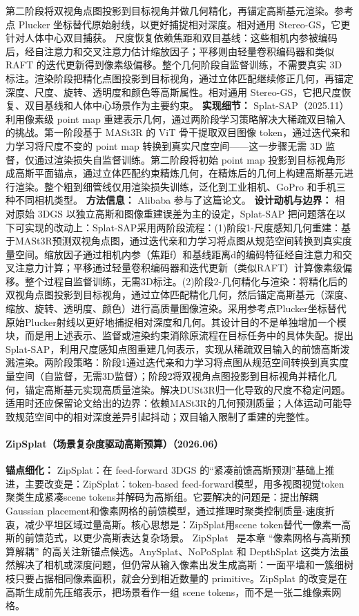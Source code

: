 第二阶段将双视角点图投影到目标视角并做几何精化，再锚定高斯基元渲染。参考点 Plucker 坐标替代原始射线，以更好捕捉相对深度。相对通用 Stereo-GS，它更针对人体中心双目捕获。
尺度恢复依赖焦距和双目基线：这些相机内参被编码后，经自注意力和交叉注意力估计缩放因子；平移则由轻量卷积编码器和类似 RAFT 的迭代更新得到像素级偏移。整个几何阶段自监督训练，不需要真实 3D 标注。渲染阶段把精化点图投影到目标视角，通过立体匹配继续修正几何，再锚定深度、尺度、旋转、透明度和颜色等高斯属性。相对通用 Stereo-GS，它把尺度恢复、双目基线和人体中心场景作为主要约束。
\textbf{实现细节：} Splat-SAP（2025.11） 利用像素级 point map 重建表示几何，通过两阶段学习策略解决大稀疏双目输入的挑战。第一阶段基于 MASt3R 的 ViT 骨干提取双目图像 token，通过迭代亲和力学习将尺度不变的 point map 转换到真实尺度空间——这一步骤无需 3D 监督，仅通过渲染损失自监督训练。第二阶段将初始 point map 投影到目标视角形成高斯平面锚点，通过立体匹配约束精炼几何，在精炼后的几何上构建高斯基元进行渲染。整个粗到细管线仅用渲染损失训练，泛化到工业相机、GoPro 和手机三种不同相机类型。
\textbf{方法信息：} Alibaba 参与了这篇论文。
\textbf{设计动机与边界：} 相对原始 3DGS 以独立高斯和图像重建误差为主的设定，Splat-SAP 把问题落在以下可实现的改动上：Splat-SAP采用两阶段流程：(1)阶段1-尺度感知几何重建：基于MASt3R预测双视角点图，通过迭代亲和力学习将点图从规范空间转换到真实度量空间。缩放因子通过相机内参（焦距f）和基线距离d的编码特征经自注意力和交叉注意力计算；平移通过轻量卷积编码器和迭代更新（类似RAFT）计算像素级偏移。整个过程自监督训练，无需3D标注。(2)阶段2-几何精化与渲染：将精化后的双视角点图投影到目标视角，通过立体匹配精化几何，然后锚定高斯基元（深度、缩放、旋转、透明度、颜色）进行高质量图像渲染。采用参考点Plucker坐标替代原始Plucker射线以更好地捕捉相对深度和几何。其设计目的不是单独增加一个模块，而是用上述表示、监督或渲染约束消除原流程在目标任务中的具体失配。提出Splat-SAP，利用尺度感知点图重建几何表示，实现从稀疏双目输入的前馈高斯泼溅渲染。两阶段策略：阶段1通过迭代亲和力学习将点图从规范空间转换到真实度量空间（自监督，无需3D监督）；阶段2将双视角点图投影到目标视角并精化几何，锚定高斯基元实现高质量渲染。解决DUSt3R归一化导致的尺度不稳定问题。适用时还应保留论文给出的边界：依赖MASt3R的几何预测质量；人体运动可能导致规范空间中的相对深度差异引起抖动；双目输入限制了重建的完整性。
\paragraph{ZipSplat（场景复杂度驱动高斯预算）（2026.06）}
\textbf{锚点细化：} ZipSplat：在 feed-forward 3DGS 的“紧凑前馈高斯预测”基础上推进，主要改变是：ZipSplat：token-based feed-forward模型，用多视图视觉token聚类生成紧凑scene tokens并解码为高斯组。它要解决的问题是：提出解耦Gaussian placement和像素网格的前馈模型，通过推理时聚类控制质量-速度折衷，减少平坦区域过量高斯。核心思想是：ZipSplat用scene token替代一像素一高斯的前馈范式，以更少高斯表达复杂场景。
ZipSplat~\cite{2606_05102} 是本章 ``像素网格与高斯预算解耦'' 的高关注新锚点候选。AnySplat、NoPoSplat 和 DepthSplat 这类方法虽然解决了相机或深度问题，但仍常从输入像素出发生成高斯：一面平墙和一簇细树枝只要占据相同像素面积，就会分到相近数量的 primitive。ZipSplat 的改变是在高斯生成前先压缩表示，把场景看作一组 scene tokens，而不是一张二维像素网格。

